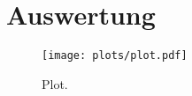 \section{Auswertung}
\label{sec:Auswertung}

\begin{figure}
  \centering
  \texttt{[image: plots/plot.pdf]}
  \caption{Plot.}
  \label{fig:plot}
\end{figure}

